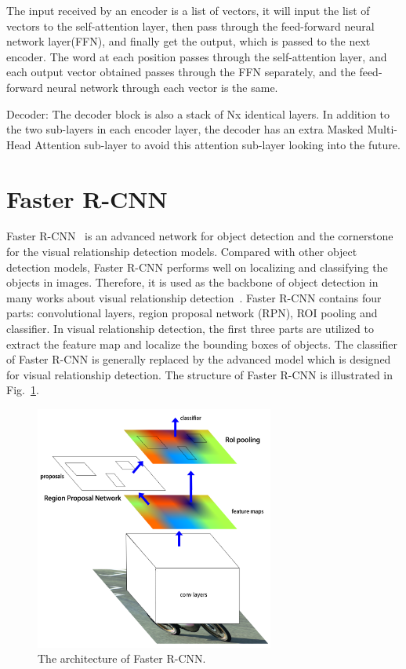 The input received by an encoder is a list of vectors, it will input the list of vectors to the self-attention layer, then pass through the feed-forward neural network layer(FFN), and finally get the output, which is passed to the next encoder. The word at each position passes through the self-attention layer, and each output vector obtained passes through the FFN separately, and the feed-forward neural network through each vector is the same.


Decoder: The decoder block is also a stack of Nx identical layers. In addition to the two sub-layers in each encoder layer, the decoder has an extra Masked Multi-Head Attention sub-layer to avoid this attention sub-layer looking into the future.


\section{Faster R-CNN}

Faster R-CNN~\cite{ren2016faster} is an advanced network for object detection and the cornerstone for the visual relationship detection models. Compared with other object detection models, Faster R-CNN performs well on localizing and classifying the objects in images. Therefore, it is used as the backbone of object detection in many works about visual relationship detection~\cite{zellers2018neural}. Faster R-CNN contains four parts: convolutional layers, region proposal network (RPN), ROI pooling and classifier. In visual relationship detection, the first three parts are utilized to extract the feature map and localize the bounding boxes of objects. The classifier of Faster R-CNN is generally replaced by the advanced model which is designed for visual relationship detection. The structure of Faster R-CNN is illustrated in Fig.~\ref{fig:fasterrcnn}.

\begin{figure}[!htbp]
	\centering
	\includegraphics[width = 0.7\textwidth]{figures/fasterrcnn.png}
	\caption[The architecture of Faster R-CNN]
	{ The architecture of Faster R-CNN.}
	\label{fig:fasterrcnn}
\end{figure}

